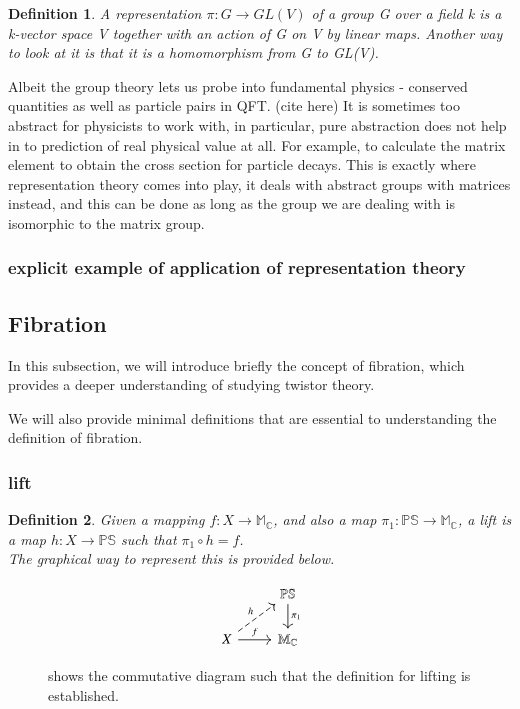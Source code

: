 \documentclass{article}
\newtheorem{definition}{Definition}
\begin{document}
\begin{definition}
  A representation $\pi: G \to GL(V)$ of a group G over a field k is a k-vector space V together
  with an action of G on V by linear maps. Another way to look at it is that it
  is a homomorphism from G to GL(V). 
\end{definition}

Albeit the group theory lets us probe into fundamental physics - conserved
quantities as well as particle pairs in QFT. (cite here) 
It is sometimes too abstract for physicists to work with, in particular, pure abstraction does not help in to prediction of real physical value at all.
 For example, to calculate the matrix element to obtain the cross section for particle decays. 
This is exactly where representation theory comes into play, it deals with
abstract groups with matrices instead,
and this can be done as long as the group we are dealing with is isomorphic
to the matrix group. 

\subsubsection{explicit example of application of representation theory}%
  \label{sub: explicit example of application of representation theory}

\subsection{Fibration}%
  \label{sub:Fibration}
  In this subsection, we will introduce briefly the concept of fibration, which provides a deeper understanding of studying twistor theory. 

We will also provide minimal definitions that are essential to
understanding the definition of fibration. 

  \subsubsection{lift}%
\begin{definition}
  Given a mapping $f: X \to \mathbb{M_C}$,
  and also a map $\pi_1: \mathbb{PS} \to \mathbb{M_C}$, a lift is a map $h:
  X \to \mathbb{PS}$ such that $\pi_1 \circ h = f$. \\ 
  The graphical way to
  represent this is provided below.  
\end{definition}


\begin{figure}[h!]
\begin{center}
    \[ \begin{tikzcd}
       & \mathbb{PS} \arrow{d}{\pi_1} \\%
      X \arrow{r}{f} \arrow[dashed]{ru}{h}& \mathbb{M_{C}} 
\end{tikzcd}
\]
\end{center}
  \caption{shows the commutative diagram such that the definition for
  lifting is established.}
\label{fig: commutative diagram of lift}
\end{figure}
\end{document}
